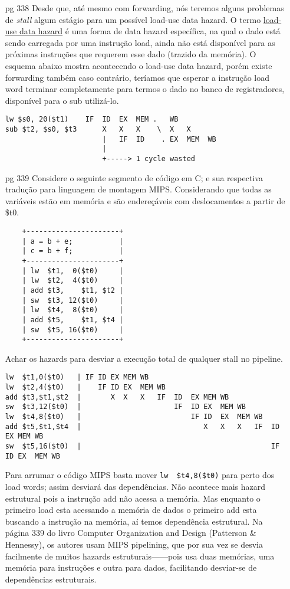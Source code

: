 \documentclass{article}
\begin{document}
\begin{enumerate}
\item[pg 338] Desde que, até mesmo com forwarding, nós teremos alguns problemas
de \textit{stall} algum estágio para um possível load-use data hazard. O termo
\underline{load-use data hazard} é uma forma de data hazard específica, na qual
o dado está sendo carregada por uma instrução load, ainda não está disponível
para as próximas instruções que requerem esse dado (trazido da memória). O
esquema abaixo mostra acontecendo o load-use data hazard, porém existe
forwarding também caso contrário, teríamos que esperar a instrução load word
terminar completamente para termos o dado no banco de registradores, disponível
para o sub utilizá-lo.

\begin{verbatim}
lw $s0, 20($t1)    IF  ID  EX  MEM .   WB
sub $t2, $s0, $t3      X   X   X    \  X   X
                       |   IF  ID    . EX  MEM  WB
                       |
                       +-----> 1 cycle wasted
\end{verbatim}

\item[pg 339] Considere o seguinte segmento de código em C; e sua respectiva 
tradução para linguagem de montagem MIPS. Considerando que todas as variáveis 
estão em memória e são endereçáveis com deslocamentos a partir de \$t0.

  \begin{verbatim}
    +----------------------+
    | a = b + e;           |
    | c = b + f;           |
    +----------------------+
    | lw  $t1,  0($t0)     |
    | lw  $t2,  4($t0)     |
    | add $t3,    $t1, $t2 |
    | sw  $t3, 12($t0)     |
    | lw  $t4,  8($t0)     |
    | add $t5,    $t1, $t4 |
    | sw  $t5, 16($t0)     |
    +----------------------+
  \end{verbatim}

Achar os hazards para desviar a execução total de qualquer stall no pipeline.

  \begin{verbatim}
lw  $t1,0($t0)   | IF ID EX MEM WB
lw  $t2,4($t0)   |    IF ID EX  MEM WB
add $t3,$t1,$t2  |       X  X   X   IF  ID  EX MEM WB
sw  $t3,12($t0)  |                      IF  ID EX  MEM WB
lw  $t4,8($t0)   |                          IF ID  EX  MEM WB
add $t5,$t1,$t4  |                             X   X   X   IF  ID  EX MEM WB
sw  $t5,16($t0)  |                                             IF  ID EX  MEM WB
  \end{verbatim}

Para arrumar o código MIPS basta mover \verb|lw  $t4,8($t0)| para perto dos load
words; assim desviará das dependências. Não acontece mais hazard estrutural pois
a instrução add não acessa a memória. Mas enquanto o primeiro load esta
acessando a memória de dados o primeiro add esta buscando a instrução na
memória, aí temos dependência estrutural. Na página 339 do livro Computer
Organization and Design (Patterson \& Hennessy), os autores usam MIPS
pipelining, que por sua vez se desvia facilmente de muitos hazards
estruturais------pois usa duas memórias, uma memória para instruções e outra
para dados, facilitando desviar-se de dependências estruturais.


\end{enumerate}
\end{document}
